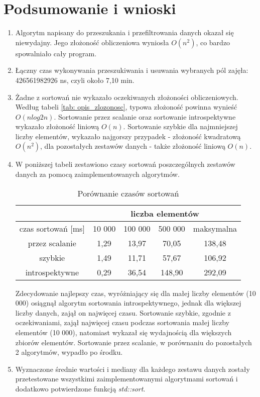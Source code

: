 \documentclass[12pt]{article}
\begin{document}
\section{Podsumowanie i wnioski}
\begin{enumerate}
    \item Algorytm napisany do przeszukania i przefiltrowania danych okazał się niewydajny. Jego złożoność obliczeniowa wyniosła $O(n^2)$, co bardzo spowalniało cały program.
    \item Łączny czas wykonywania przeszukiwania i usuwania wybranych pól zajęła: 426561982926 ns, czyli około 7,10 min.
    \item Żadne z sortowań nie wykazało oczekiwanych złożoności obliczeniowych. Według tabeli \ref{tab: opis_zlozonosc}, typowa złożoność powinna wynieść $O(n log2 n)$. Sortowanie przez scalanie oraz sortowanie introspektywne wykazało złożoność liniową $O(n)$. Sortowanie szybkie dla najmniejszej liczby elementów, wykazało najgorszy przypadek - złożoność kwadratową $O(n^2)$, dla pozostałych zestawów danych - także złożoność liniową $O(n)$.
    \item W poniższej tabeli zestawiono czasy sortowań poszczególnych zestawów danych za pomocą zaimplementowanych algorytmów.
    \begin{table}[H]
        \centering
        \caption{Porównanie czasów sortowań}
        \label{tab:por_czas}
        \begin{tabular}{|c|cccc|}
        \hline
                               & \multicolumn{4}{c|}{liczba elementów}                                                                  \\ \hline
        czas sortowań {[}ms{]} & \multicolumn{1}{c|}{10 000} & \multicolumn{1}{c|}{100 000} & \multicolumn{1}{c|}{500 000} & maksymalna \\ \hline
        przez scalanie         & \multicolumn{1}{c|}{1,29}   & \multicolumn{1}{c|}{13,97}   & \multicolumn{1}{c|}{70,05}   & 138,48     \\ \hline
        szybkie                & \multicolumn{1}{c|}{1,49}   & \multicolumn{1}{c|}{11,71}   & \multicolumn{1}{c|}{57,67}   & 106,92     \\ \hline
        introspektywne         & \multicolumn{1}{c|}{0,29}   & \multicolumn{1}{c|}{36,54}   & \multicolumn{1}{c|}{148,90}  & 292,09     \\ \hline
        \end{tabular}
    \end{table}
    Zdecydowanie najlepszy czas, wyróżniający się dla małej liczby elementów (10 000) osiągnął algorytm sortowania introspektywnego, jednak dla większej liczby danych, zajął on najwięcej czasu. Sortowanie szybkie, zgodnie z oczekiwaniami, zajął najwięcej czasu podczas sortowania małej liczby elementów (10 000), natomiast wykazał się wydajnością dla większych zbiorów elementów. Sortowanie przez scalanie, w porównaniu do pozostałych 2 algorytmów, wypadło po środku.
    \item Wyznaczone średnie wartości i mediany dla każdego zestawu danych zostały przetestowane wszystkimi zaimplementowanymi algorytmami sortowań i dodatkowo potwierdzone funkcją \textit{std::sort}.


\end{enumerate}
\end{document}
